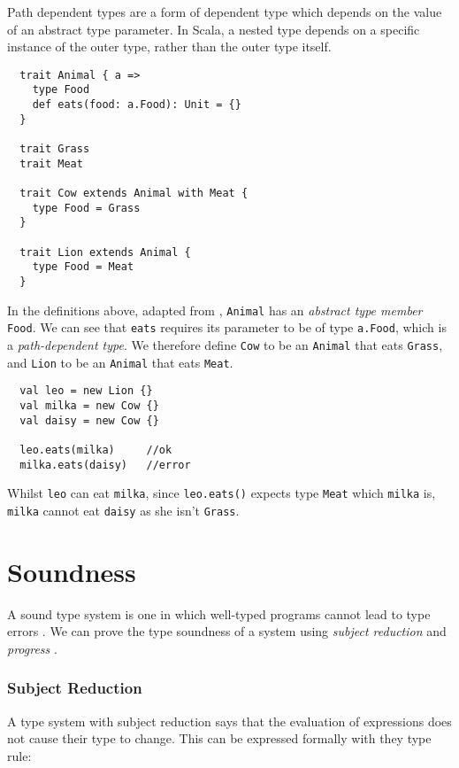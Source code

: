Path dependent types are a form of dependent type which depends on the value of an abstract type parameter.
In Scala, a nested type depends on a specific instance of the outer type, rather than the outer type itself.
\begin{verbatim}
  trait Animal { a =>
    type Food
    def eats(food: a.Food): Unit = {}
  }

  trait Grass
  trait Meat

  trait Cow extends Animal with Meat {
    type Food = Grass
  }

  trait Lion extends Animal {
    type Food = Meat
  }
\end{verbatim}
In the definitions above, adapted from \cite{Amin2014}, \texttt{Animal} has an \textit{abstract type member} \texttt{Food}. We can see that \texttt{eats} requires its parameter to be of type \texttt{a.Food}, which is a \textit{path-dependent type}. We therefore define \texttt{Cow} to be an \texttt{Animal} that eats \texttt{Grass}, and \texttt{Lion} to be an \texttt{Animal} that eats \texttt{Meat}.
\begin{verbatim}
  val leo = new Lion {}
  val milka = new Cow {}
  val daisy = new Cow {}

  leo.eats(milka)     //ok
  milka.eats(daisy)   //error
\end{verbatim}
Whilst \texttt{leo} can eat \texttt{milka}, since \texttt{leo.eats()} expects type \texttt{Meat} which \texttt{milka} is, \texttt{milka} cannot eat \texttt{daisy} as she isn't \texttt{Grass}.

\section{Soundness}

A sound type system is one in which well-typed programs cannot lead to type errors \cite{Wright1994}. We can prove the type soundness of a system using \textit{subject reduction} and \textit{progress} \cite{Igarashi2001}.

\subsubsection{Subject Reduction}

A type system with subject reduction says that the evaluation of expressions does not cause their type to change. This can be expressed formally with they type rule:

\begin{mathpar}
\end{mathpar}

